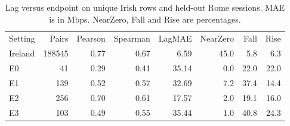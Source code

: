 \begin{table}[!ht]
\centering\small
\caption{Lag versus endpoint on unique Irish rows and held-out Rome sessions. MAE is in Mbps. NearZero, Fall and Rise are percentages.}
\begin{tabular}{lrrrrrrr}
\hline
Setting & Pairs & Pearson & Spearman & LagMAE & NearZero & Fall & Rise \\
Ireland & 188545 & 0.77 & 0.67 & 6.59 & 45.0 & 5.8 & 6.3 \\
E0 & 41 & 0.29 & 0.41 & 35.14 & 0.0 & 22.0 & 22.0 \\
E1 & 139 & 0.52 & 0.57 & 32.69 & 7.2 & 37.4 & 14.4 \\
E2 & 256 & 0.70 & 0.61 & 17.57 & 2.0 & 19.1 & 16.0 \\
E3 & 103 & 0.49 & 0.55 & 35.44 & 1.0 & 40.8 & 24.3 \\
\hline
\end{tabular}
\end{table}
